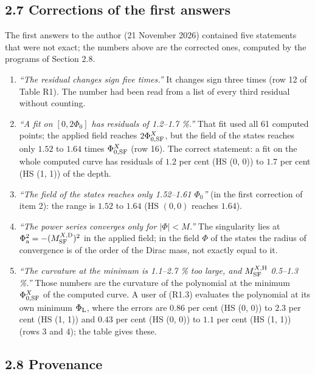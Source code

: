 \documentclass[
  10pt,
]{article}
\providecommand{\tightlist}{%
  \setlength{\itemsep}{0pt}\setlength{\parskip}{0pt}}
\begin{document}
\hypertarget{corrections-of-the-first-answers}{%
\subsection{2.7 Corrections of the first
answers}\label{corrections-of-the-first-answers}}

The first answers to the author (21 November 2026) contained five
statements that were not exact; the numbers above are the corrected
ones, computed by the programs of Section 2.8.

\begin{enumerate}
\def\labelenumi{\arabic{enumi}.}
\tightlist
\item
  \emph{``The residual changes sign five times.''} It changes sign three
  times (row 12 of Table R1). The number had been read from a list of
  every third residual without counting.
\item
  \emph{``A fit on \([0,2\Phi_0]\) has residuals of 1.2--1.7 \%.''} That
  fit used all 61 computed points; the applied field reaches
  \(2\Phi^X_{0,{\rm SF}}\), but the field of the states reaches only
  \(1.52\) to \(1.64\) times \(\Phi^X_{0,{\rm SF}}\) (row 16). The
  correct statement: a fit on the whole computed curve has residuals of
  \(1.2\) per cent (HS (0, 0)) to \(1.7\) per cent (HS (1, 1)) of the
  depth.
\item
  \emph{``The field of the states reaches only 1.52--1.61 \(\Phi_0\)''}
  (in the first correction of item 2): the range is \(1.52\) to \(1.64\)
  (HS \((0,0)\) reaches \(1.64\)).
\item
  \emph{``The power series converges only for \(\lvert\Phi\rvert<M\).''}
  The singularity lies at \(\Phi_{\rm a}^2=-(M^{X,{\rm D}}_{\rm SF})^2\)
  in the applied field; in the field \(\Phi\) of the states the radius
  of convergence is of the order of the Dirac mass, not exactly equal to
  it.
\item
  \emph{``The curvature at the minimum is 1.1--2.7 \% too large, and
  \(M^{X,{\rm H}}_{\rm SF}\) 0.5--1.3 \%.''} Those numbers are the
  curvature of the polynomial at the minimum \(\Phi^X_{0,{\rm SF}}\) of
  the computed curve. A user of (R1.3) evaluates the polynomial at its
  own minimum \(\Phi_{\rm L}\), where the errors are \(0.86\) per cent
  (HS (0, 0)) to \(2.3\) per cent (HS (1, 1)) and \(0.43\) per cent (HS
  (0, 0)) to \(1.1\) per cent (HS (1, 1)) (rows 3 and 4); the table
  gives these.
\end{enumerate}

\hypertarget{provenance}{%
\subsection{2.8 Provenance}\label{provenance}}
\end{document}
